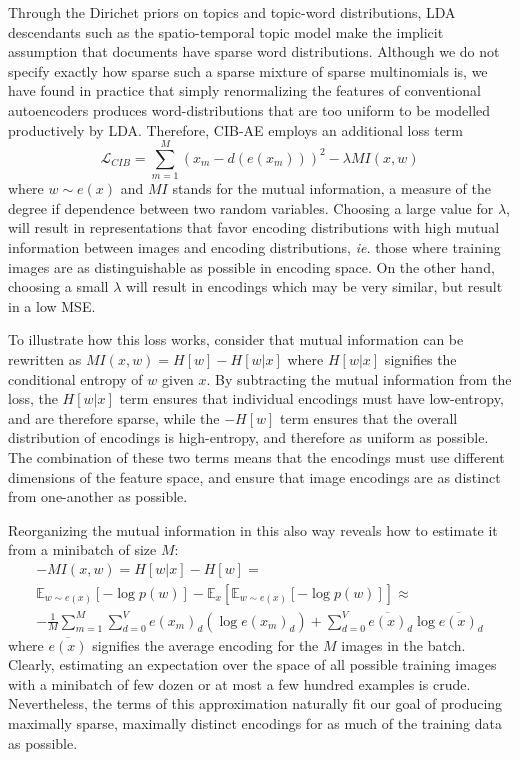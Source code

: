 Through the Dirichet priors on topics and topic-word distributions, LDA descendants such as the spatio-temporal topic model make the implicit assumption that documents have sparse word distributions. Although we do not specify exactly how sparse such a sparse mixture of sparse multinomials is, we have found in practice that simply renormalizing the features of conventional autoencoders produces word-distributions that are too uniform to be modelled productively by LDA. Therefore, CIB-AE employs an additional loss term
\begin{equation}
    \mathcal{L}_{CIB} = \sum_{m=1}^M(x_m - d(e(x_m)))^2 - \lambda MI\left(x, w\right)
\end{equation}
where $w \sim e(x)$ and $MI$ stands for the mutual information, a measure of the degree if dependence between two random variables. Choosing a large value for $\lambda$, will result in representations that favor encoding distributions with high mutual information between images and encoding distributions, \emph{ie.} those where training images are as distinguishable as possible in encoding space. On the other hand, choosing a small $\lambda$ will result in encodings which may be very similar, but result in a low MSE. 

To illustrate how this loss works, consider that mutual information can be rewritten as $MI\left(x, w\right) = H[w] - H[w | x] $ where $H[w | x]$ signifies the conditional entropy of $w$ given $x$. By subtracting the mutual information from the loss, the $H[w | x]$ term ensures that individual encodings must have low-entropy, and are therefore sparse, while the $-H[w]$ term ensures that the overall distribution of encodings is high-entropy, and therefore as uniform as possible. The combination of these two terms means that the encodings must use different dimensions of the feature space, and ensure that image encodings are as distinct from one-another as possible.

Reorganizing the mutual information in this also way reveals how to estimate it from a minibatch of size $M$:
\begin{equation}
\begin{split}
    -MI\left(x, w\right) = H[w | x] - H[w] = \\
    \mathbb{E}_{w \sim e(x)}\left[ -\log p(w) \right] - \mathbb{E}_x\left[ \mathbb{E}_{w \sim e(x)}\left[ -\log p(w) \right] \right] \approx \\
    -\frac{1}{M} \sum_{m=1}^M \sum_{d=0}^V e(x_m)_d (\log e(x_m)_d) +
            \sum_{d=0}^V \overline{e(x)}_d \log \overline{e(x)}_d
    \end{split}
\end{equation}
where $\overline{e(x)}$ signifies the average encoding for the $M$ images in the batch. Clearly, estimating an expectation over the space of all possible training images with a minibatch of few dozen or at most a few hundred examples is crude. Nevertheless, the terms of this approximation naturally fit our goal of producing maximally sparse, maximally distinct encodings for as much of the training data as possible.


